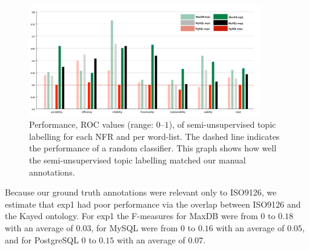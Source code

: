 \documentclass[smallextended]{svjour3}       %
\begin{document}



\begin{figure}[t]
  \centering
 \includegraphics[width=0.9\textwidth]{figures/unsupervised-bar}
 \caption{Performance, ROC values (range: $0$--$1$), of semi-unsupervised topic labelling for
   each NFR and per word-list. The dashed line indicates the performance of a random classifier. This graph shows how well the
   semi-unsupervised topic labelling matched our manual annotations.}


  \label{fig:maxdb-unsup-results}
\end{figure}


Because our ground truth annotations were relevant only to ISO9126,
we estimate that \textsf{exp1} had poor
performance via the overlap between ISO9126 and the Kayed ontology.
For \textsf{exp1} the F-measures for MaxDB were from $0$ to $0.18$ with an average
of $0.03$, for MySQL were from $0$ to $0.16$ with an average of
$0.05$, and for PostgreSQL $0$ to $0.15$ with an average of $0.07$. 


\end{document}
